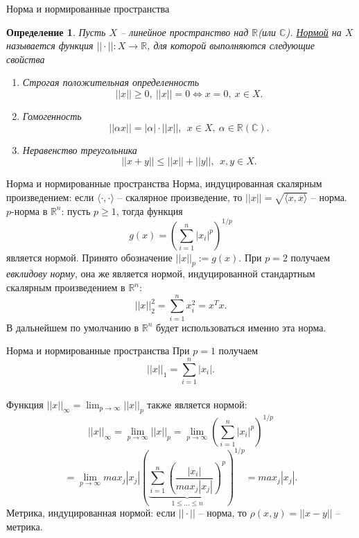 \documentclass[10pt, handout]{beamer}
\newtheorem{definition_ru}{Определение}[]
\begin{document}
\begin{frame}{Норма и нормированные пространства}
\begin{definition_ru}
Пусть $X$ -- линейное пространство над $\mathbb{R}$(или $\mathbb{C}$). \underline{Нормой} на $X$ называется функция $||\cdot||:X\rightarrow \mathbb{R}$, для которой выполняются следующие свойства
\begin{enumerate}
\item Строгая положительная определенность
$$
||x||\geq 0,~||x||=0\Leftrightarrow x=0,~x\in X.
$$
\item Гомогенность
$$
||\alpha x||=|\alpha|\cdot ||x||, ~~x\in X,~\alpha\in \mathbb{R}(\mathbb{C}).
$$
\item Неравенство треугольника
$$
||x+y||\leq ||x||+||y||,~~x,y\in X.
$$
\end{enumerate}
\end{definition_ru}

\end{frame}

\begin{frame}{Норма и нормированные пространства}
Норма, индуцированная скалярным произведением: если $\langle \cdot, \cdot \rangle$ -- скалярное произведение, то $||x||=\sqrt{\langle x, x \rangle}$ -- норма.\\
\pause
\vspace{1em}
$p$-норма в $\mathbb{R}^n$: пусть $p\geq 1$, тогда функция 
$$
g(x)=\left(\sum_{i=1}^n|x_i|^p\right)^{1/p}
$$
является нормой. Принято обозначение $||x||_p:=g(x)$. При $p=2$ получаем \textit{евклидову норму}, она же является нормой, индуцированной стандартным скалярным произведением в $\mathbb{R}^n$:
$$
||x||_2^2=\sum_{i=1}^nx^2_i=x^Tx.
$$
В дальнейшем по умолчанию в $\mathbb{R}^n$ будет использоваться именно эта норма.
\end{frame}

\begin{frame}{Норма и нормированные пространства}
При $p=1$ получаем
$$
||x||_1=\sum_{i=1}^n|x_i|.
$$
\\
\pause
Функция $||x||_\infty=\lim_{p\rightarrow\infty}||x||_p$ также является нормой:
$$
||x||_\infty=\lim_{p\rightarrow\infty}||x||_p=\lim_{p\rightarrow\infty}\left(\sum_{i=1}^n|x_i|^p\right)^{1/p}
$$
$$
=\lim_{p\rightarrow\infty}max_j|x_j|\left(\underbrace{\sum_{i=1}^n\left(\frac{|x_i|}{max_j|x_j|}\right)^p}_{1\leq \ldots \leq n}\right)^{1/p}
=max_j|x_j|.
$$
\pause
Метрика, индуцированная нормой: если $||\cdot||$ -- норма, то $\rho(x,y)=||x-y||$ -- метрика.
\end{frame}
\end{document}
